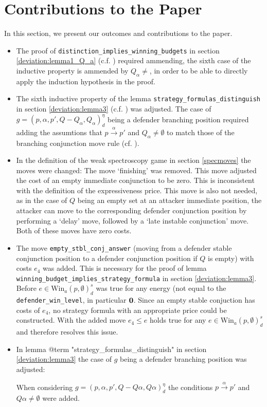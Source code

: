 \section{Contributions to the Paper}
In this section, we present our outcomes and contributions to the paper.
\begin{itemize}
    \item The proof of \texttt{distinction\_implies\_winning\_budgets} in section \ref{deviation:lemma1_Q_a} 
    (c.f. \cite[lemma $1$]{bisping2023lineartimebranchingtime}) required ammending, the sixth case
    of the inductive property is ammended by $Q_\alpha \neq {}$, in order to be able to directly
    apply the induction hypothesis in the proof.

    \item The sixth inductive property of the lemma \texttt{strategy\_formulas\_distinguish} in section \ref{deviation:lemma3} 
    (c.f. \cite[lemma $3$]{bisping2023lineartimebranchingtime}) was adjusted.
    The case of $g=(p,\alpha ,p', Q- Q_\alpha, Q_\alpha)_d^\eta$ being a defender branching position
    required adding the assumtions that $p \overset{\alpha}{\longrightarrow} p'$ and $Q_\alpha \neq \emptyset$
    to match those of the branching conjunction move rule (cf. \cite[p. 13]{bisping2023lineartimebranchingtime}). 

    \item In the definition of the weak spectroscopy game in section \ref{specmoves} the moves were changed: 
    The move `finishing' was removed. This move adjusted the cost of an empty immediate conjunction to be zero.
    This is inconsistent with the definition of the expressiveness price. This move is also not needed, as in the case of $Q$ being an empty set at an attacker immediate position, the attacker can move to the corresponding
    defender conjunction position by performing a `delay' move, followed by a `late instable conjunction' move. Both of these moves have zero costs.

    \item The move \texttt{empty\_stbl\_conj\_answer} (moving from a defender stable conjunction position to a defender conjunction
    position if $Q$ is empty) with costs $e_4$ was added. This is necessary for the proof of lemma\\ 
    \texttt{winning\_budget\_implies\_strategy\_formula} in section \ref{deviation:lemma3}. Before 
    $e \in \text{Win}_a (p, \emptyset)_d^s $ was true for any energy (not equal to the \texttt{defender\_win\_level}, in particular $\bold{0}$. 
    Since an empty stable conjuction has costs of $e_4$, no strategy formula with an appropriate price could be constructed. 
    With the added move $e_4 \leq e $ holds true for any $e \in \text{Win}_a (p, \emptyset)_d^s $ and therefore resolves this issue.

    \item In lemma @{term "strategy\_formulas\_distinguish"} in section \ref{deviation:lemma3} the case of $g$ being a defender branching position was adjusted: 
    
    When considering $g=(p,\alpha ,p', Q- Q \alpha, Q \alpha)_d^\eta$ the conditions $p \overset{\alpha}{\longrightarrow} p'$ and $Q \alpha \neq \emptyset$ were added. 
\end{itemize}
